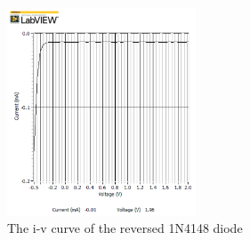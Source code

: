 \documentclass[letterpaper, 10 pt, conference]{ieeeconf}  %
\begin{document}
	\begin{figure}[h]
        \centering
        \includegraphics[width=0.5\textwidth]{images/result6.png}
        \caption{The i-v curve of the reversed 1N4148 diode}
		\label{fig:7}
    \end{figure}
\end{document}
